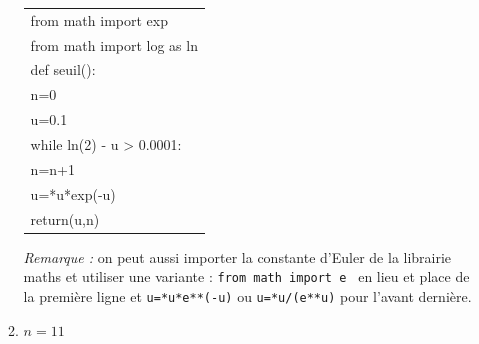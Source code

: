 \begin{enumerate}
\begin{enumerate}
	\begin{center}
		\ttfamily
		\begin{tabularx}{10cm}{|X|}\hline
			from math import exp\\
			from math import log as ln\\
			def seuil():\\
			\quad n=0\\
			\quad u=0.1\\
			\quad while ln(2) - u {\red >} 0.0001:\\
			\quad \quad n=n+1\\
			\quad \quad u={\red 2*u*exp(-u)}\\
			\quad return(u,n)\\ \hline
		\end{tabularx}
	\end{center}

\emph{Remarque :} on peut aussi importer la constante d'Euler de la librairie maths et utiliser une variante :
			\texttt{from math import e } en lieu et place de la première ligne et
			\texttt{u={*u*e**(-u)}} ou \texttt{u={*u/(e**u)}} pour l'avant dernière.
			\item $n = 11$	
		\end{enumerate}
	\end{enumerate}

